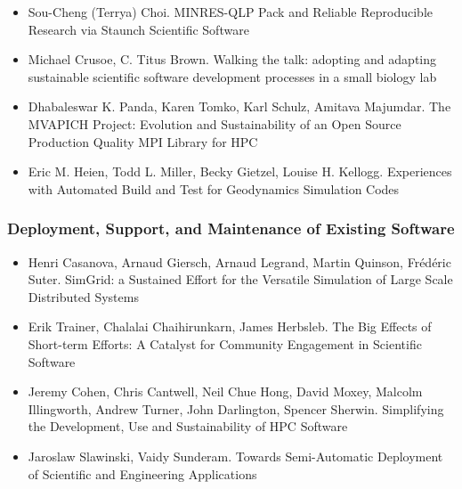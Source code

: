 \documentclass[11pt, oneside]{amsart}
\begin{document}
\begin{itemize}
\item Sou-Cheng (Terrya) Choi. MINRES-QLP Pack and Reliable
  Reproducible Research via Staunch Scientific Software
  \cite{Choi_WSSSPE}

\item Michael Crusoe, C. Titus Brown. Walking the talk: adopting and
  adapting sustainable scientific software development processes in a
  small biology lab \cite{Crusoe_WSSSPE}

\item Dhabaleswar K. Panda, Karen Tomko, Karl Schulz, Amitava Majumdar.
The MVAPICH Project: Evolution and Sustainability of an Open Source
Production Quality MPI Library for HPC \cite{Panda_WSSSPE}

\item Eric M. Heien, Todd L. Miller, Becky Gietzel, Louise
  H. Kellogg. Experiences with Automated Build and Test for
  Geodynamics Simulation Codes \cite{Heien_WSSSPE}

\end{itemize}

\subsubsection*{Deployment, Support, and Maintenance of Existing Software}

\begin{itemize}

\item Henri Casanova, Arnaud Giersch, Arnaud Legrand, Martin Quinson,
  Fr\'{e}d\'{e}ric Suter. SimGrid: a Sustained Effort for the
  Versatile Simulation of Large Scale Distributed
  Systems~\cite{Casanova_WSSSPE}

\item Erik Trainer, Chalalai Chaihirunkarn, James Herbsleb. The Big
  Effects of Short-term Efforts: A Catalyst for Community Engagement
  in Scientific Software \cite{Trainer_WSSSPE}

\item Jeremy Cohen, Chris Cantwell, Neil Chue Hong, David Moxey,
  Malcolm Illingworth, Andrew Turner, John Darlington, Spencer
  Sherwin. Simplifying the Development, Use and Sustainability of HPC
  Software \cite{Cohen_WSSSPE}

\item Jaroslaw Slawinski, Vaidy Sunderam. Towards Semi-Automatic
  Deployment of Scientific and Engineering Applications
  \cite{Slawinski_WSSSPE}

\end{itemize}
\end{document}
